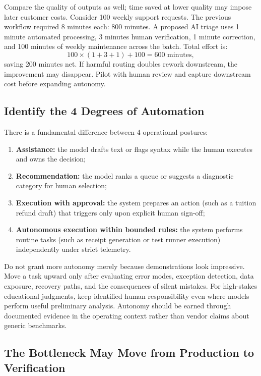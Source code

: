 Compare the quality of outputs as well; time saved at lower quality may impose later customer costs. Consider 100 weekly support requests. The previous workflow required 8 minutes each: 800 minutes. A proposed AI triage uses 1 minute automated processing, 3 minutes human verification, 1 minute correction, and 100 minutes of weekly maintenance across the batch. Total effort is:
\begin{equation}
100 \times (1 + 3 + 1) + 100 = 600\text{ minutes},
\end{equation}
saving 200 minutes net. If harmful routing doubles rework downstream, the improvement may disappear. Pilot with human review and capture downstream cost before expanding autonomy.

\subsection{Identify the 4 Degrees of Automation}
\label{sec:four_degrees_automation}

There is a fundamental difference between 4 operational postures:
\begin{enumerate}
    \item \textbf{Assistance:} the model drafts text or flags syntax while the human executes and owns the decision;
    \item \textbf{Recommendation:} the model ranks a queue or suggests a diagnostic category for human selection;
    \item \textbf{Execution with approval:} the system prepares an action (such as a tuition refund draft) that triggers only upon explicit human sign-off;
    \item \textbf{Autonomous execution within bounded rules:} the system performs routine tasks (such as receipt generation or test runner execution) independently under strict telemetry.
\end{enumerate}

Do not grant more autonomy merely because demonstrations look impressive. Move a task upward only after evaluating error modes, exception detection, data exposure, recovery paths, and the consequences of silent mistakes. For high-stakes educational judgments, keep identified human responsibility even where models perform useful preliminary analysis. Autonomy should be earned through documented evidence in the operating context rather than vendor claims about generic benchmarks.

\subsection{The Bottleneck May Move from Production to Verification}
\label{sec:verification_bottleneck}

